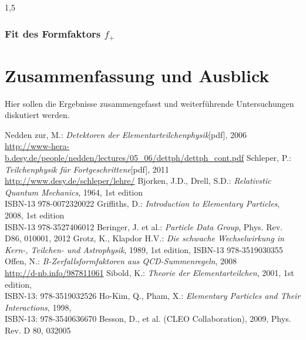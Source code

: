 \documentclass[11pt,a4paper,twoside]{report}
\begin{document}
\begin{spacing}{1,5}
\subsection{Fit des Formfaktors $f_+$}


\chapter{Zusammenfassung und Ausblick}

Hier sollen die Ergebnisse zusammengefasst und weiterf\"uhrende Untersuchungen diskutiert werden. 



\begin{appendix}
%
\end{appendix}


\renewcommand{\bibname}{Literaturverzeichnis}
% 
%
\begin{thebibliography}{xxx}
 Nedden zur, M.: \textit{Detektoren der Elementarteilchenphysik}[pdf], 2006\\ \href{http://www-hera-b.desy.de/people/nedden/lectures/05_06/dettph/dettph_cont.pdf}{http://www-hera-b.desy.de/people/nedden/lectures/05\_06/dettph/dettph\_cont.pdf}
 Schleper, P.: \textit{Teilchenphysik für Fortgeschrittene}[pdf], 2011\\ \href{http://www.desy.de/~schleper/lehre/}{http://www.desy.de/\midtilde schleper/lehre/}
 Bjorken, J.D., Drell, S.D.: \textit{Relativstic Quantum Mechanics}, 1964, 1st edition \\ISBN-13 978-0072320022 
 Griffiths, D.: \textit{Introduction to Elementary Particles}, 2008, 1st edition \\ISBN-13 978-3527406012
  Beringer, J. et al.: \textit{Particle Data Group}, Phys. Rev. D86, 010001, 2012
 Grotz, K., Klapdor H.V.: \textit{Die schwache Wechselwirkung in Kern-, Teilchen- und Astrophysik}, 1989, 1st edition, ISBN-13 978-3519030355
 Offen, N.: \textit{B-Zerfallsformfaktoren aus QCD-Summenregeln}, 2008\\ \href{http://d-nb.info/987811061}{http://d-nb.info/987811061}
 Sibold, K.: \textit{Theorie der Elementarteilchen}, 2001, 1st edition, \\ISBN-13: 978-3519032526
 Ho-Kim, Q., Pham, X.: \textit{Elementary Particles and Their Interactions}, 1998, \\ ISBN-13: 978-3540636670
 Besson, D., et al. (CLEO Collaboration), 2009, Phys. Rev. D 80, 032005 
\end{thebibliography}


\newpage
\thispagestyle{empty}
\ \\



\end{spacing}
\end{document}
